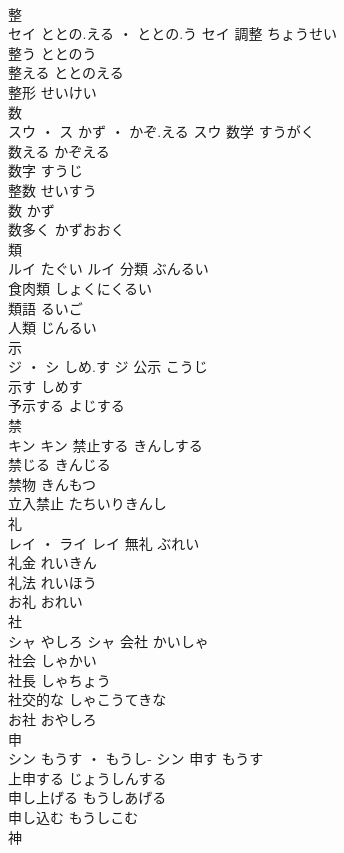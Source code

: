 \documentclass[8pt]{extreport}
\begin{document}
\begin{CJK}{UTF8}{min}
\\	整	
\\	セイ	ととの.える ・ ととの.う	セイ	調整	ちょうせい	
\\	整う	ととのう	
\\	整える	ととのえる	
\\	整形	せいけい	
\\	数	
\\	スウ ・ ス	かず ・ かぞ.える	スウ	数学	すうがく	
\\	数える	かぞえる	
\\	数字	すうじ	
\\	整数	せいすう	
\\	数	かず	
\\	数多く	かずおおく	
\\	類	
\\	ルイ	たぐい	ルイ	分類	ぶんるい	
\\	食肉類	しょくにくるい	
\\	類語	るいご	
\\	人類	じんるい	
\\	示	
\\	ジ ・ シ	しめ.す	ジ	公示	こうじ	
\\	示す	しめす	
\\	予示する	よじする	
\\	禁	
\\	キン		キン	禁止する	きんしする	
\\	禁じる	きんじる	
\\	禁物	きんもつ	
\\	立入禁止	たちいりきんし	
\\	礼	
\\	レイ ・ ライ		レイ	無礼	ぶれい	
\\	礼金	れいきん	
\\	礼法	れいほう	
\\	お礼	おれい	
\\	社	
\\	シャ	やしろ	シャ	会社	かいしゃ	
\\	社会	しゃかい	
\\	社長	しゃちょう	
\\	社交的な	しゃこうてきな	
\\	お社	おやしろ	
\\	申	
\\	シン	もうす ・ もうし-	シン	申す	もうす	
\\	上申する	じょうしんする	
\\	申し上げる	もうしあげる	
\\	申し込む	もうしこむ	
\\	神	

\end{CJK}
\end{document}
